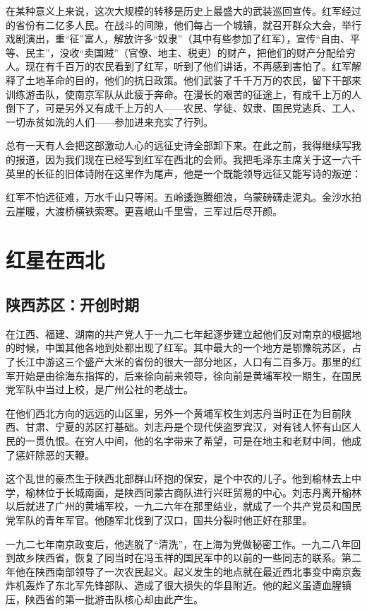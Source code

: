 \documentclass[10pt]{book}
\begin{document}
在某种意义上来说，这次大规模的转移是历史上最盛大的武装巡回宣传。红军经过的省份有二亿多人民。在战斗的间隙，他们每占一个城镇，就召开群众大会，举行戏剧演出，重“征”富人，解放许多“奴隶”（其中有些参加了红军），宣传“自由、平等、民主”，没收“卖国贼”（官僚、地主、税吏）的财产，把他们的财产分配给穷人。现在有千百万的农民看到了红军，听到了他们讲话，不再感到害怕了。红军解释了土地革命的目的，他们的抗日政策。他们武装了千千万万的农民，留下干部来训练游击队，使南京军队从此疲于奔命。在漫长的艰苦的征途上，有成千上万的人倒下了，可是另外又有成千上万的人——农民、学徒、奴隶、国民党逃兵、工人、一切赤贫如洗的人们——参加进来充实了行列。

总有一天有人会把这部激动人心的远征史诗全部卸下来。在此之前，我得继续写我的报道，因为我们现在已经写到红军在西北的会师。我把毛泽东主席关于这一六千英里的长征的旧体诗附在这里作为尾声，他是一个既能领导远征又能写诗的叛逆：

红军不怕远征难，万水千山只等闲。五岭逶迤腾细浪，乌蒙磅礴走泥丸。金沙水拍云崖暖，大渡桥横铁索寒。更喜岷山千里雪，三军过后尽开颜。



\chapter{红星在西北}

\section{陕西苏区：开创时期}

在江西、福建、湖南的共产党人于一九二七年起逐步建立起他们反对南京的根据地的时候，中国其他各地到处都出现了红军。其中最大的一个地方是鄂豫皖苏区，占了长江中游这三个盛产大米的省份的很大一部分地区，人口有二百多万。那里的红军开始是由徐海东指挥的，后来徐向前来领导，徐向前是黄埔军校一期生，在国民党军队中当过上校，是广州公社的老战士。

在他们西北方向的远远的山区里，另外一个黄埔军校生刘志丹当时正在为目前陕西、甘肃、宁夏的苏区打基础。刘志丹是个现代侠盗罗宾汉，对有钱人怀有山区人民的一贯仇恨。在穷人中间，他的名字带来了希望，可是在地主和老财中间，他成了惩奸除恶的天鞭。

这个乱世的豪杰生于陕西北部群山环抱的保安，是个中农的儿子。他到榆林去上中学，榆林位于长城南面，是陕西同蒙古商队进行兴旺贸易的中心。刘志丹离开榆林以后就进了广州的黄埔军校，一九二六年在那里结业，就成了一个共产党员和国民党军队的青年军官。他随军北伐到了汉口，国共分裂时他正好在那里。

一九二七年南京政变后，他逃脱了“清洗”，在上海为党做秘密工作。一九二八年回到故乡陕西省，恢复了同当时在冯玉祥的国民军中的以前的一些同志的联系。第二年他在陕西南部领导了一次农民起义。起义发生的地点就在最近西北事变中南京轰炸机轰炸了东北军先锋部队、造成了很大损失的华县附近。他的起义虽遭血腥镇压，陕西省的第一批游击队核心却由此产生。
\end{document}

